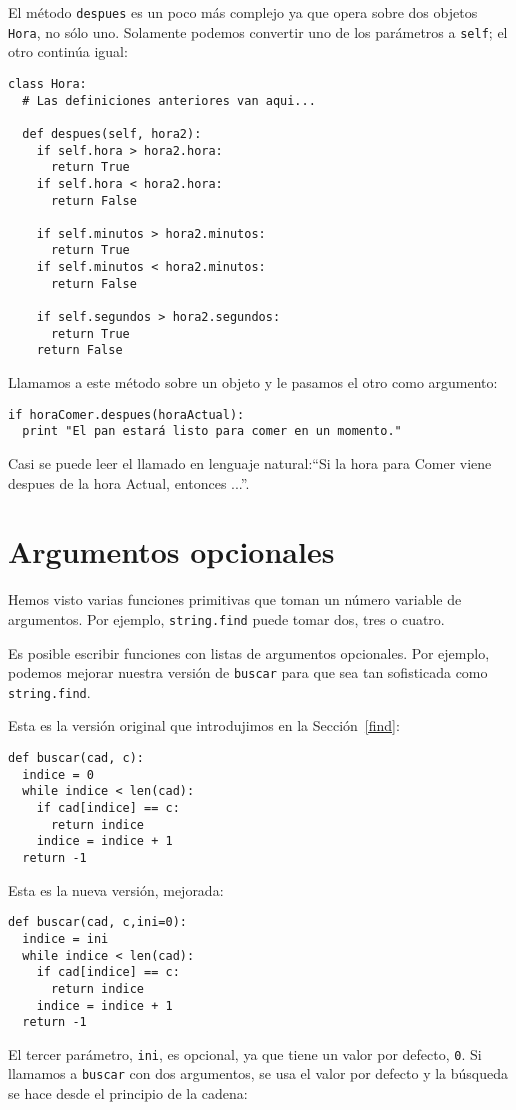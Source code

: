 El método \texttt{despues} es un poco más complejo ya que opera sobre
dos objetos  \texttt{Hora}, no sólo uno.  Solamente podemos convertir
uno de los parámetros a  \texttt{self}; el otro continúa igual:

\beforeverb
\begin{verbatim}
class Hora:
  # Las definiciones anteriores van aqui...

  def despues(self, hora2):
    if self.hora > hora2.hora:
      return True
    if self.hora < hora2.hora:
      return False

    if self.minutos > hora2.minutos:
      return True
    if self.minutos < hora2.minutos:
      return False

    if self.segundos > hora2.segundos:
      return True
    return False
\end{verbatim}
\afterverb
%
Llamamos a este método sobre un objeto y le pasamos el otro como
argumento:

\beforeverb
\begin{verbatim}
if horaComer.despues(horaActual):
  print "El pan estará listo para comer en un momento."
\end{verbatim}
\afterverb
%
Casi se puede leer el llamado en lenguaje natural:``Si la hora para Comer
viene despues de la hora Actual, entonces ...''.


\section{Argumentos opcionales}

Hemos visto varias funciones primitivas que toman un número variable
de argumentos. Por ejemplo, \texttt{string.find} puede tomar dos, tres o
cuatro.

Es posible escribir funciones con listas de argumentos opcionales. Por
ejemplo, podemos mejorar nuestra versión de  \texttt{buscar} para
que sea tan sofisticada como \texttt{string.find}.

Esta es la versión original que introdujimos en la  Sección~\ref{find}:

\beforeverb
\begin{verbatim}
def buscar(cad, c):
  indice = 0
  while indice < len(cad):
    if cad[indice] == c:
      return indice
    indice = indice + 1
  return -1
\end{verbatim}
\afterverb
%
Esta es la nueva versión, mejorada:

\beforeverb
\begin{verbatim}
def buscar(cad, c,ini=0):
  indice = ini
  while indice < len(cad):
    if cad[indice] == c:
      return indice
    indice = indice + 1
  return -1
\end{verbatim}
\afterverb
%
El tercer parámetro, \texttt{ini}, es opcional, ya que tiene un
valor por defecto, \texttt{0}. Si llamamos a  \texttt{buscar} con
dos argumentos, se usa el valor por defecto y la búsqueda 
se hace desde el principio de la cadena:


